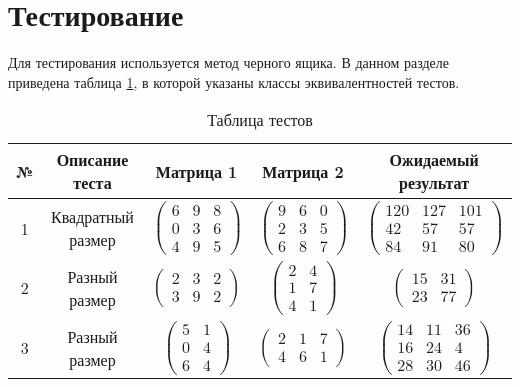\section{Тестирование}
Для тестирования используется метод черного ящика. В данном разделе приведена таблица \ref{table:ref1}, в которой указаны классы эквивалентностей тестов.
\begin{table}[H]
	\centering
	\captionsetup{singlelinecheck = false, justification=raggedleft}
	\caption{Таблица тестов}
	\label{table:ref1}
	\begin{tabular}{|c|c|c|c|c|}
		\hline
		№ &Описание теста & Матрица 1  &  Матрица 2   &  Ожидаемый результат\\\hline
		1& Квадратный размер  & $\begin{pmatrix}6 & 9 & 8\\0 & 3 & 6\\4 & 9 & 5\end{pmatrix}$
		& $\begin{pmatrix}9 & 6 & 0\\2 & 3 & 5\\6 & 8 & 7\end{pmatrix}$
		& $\begin{pmatrix}120 & 127 & 101\\42 & 57 & 57\\84 & 91 & 80\end{pmatrix}$
		\\ \hline
		2& Разный размер	  & $\begin{pmatrix}2 & 3 & 2\\3 & 9 & 2\end{pmatrix}$
		& $\begin{pmatrix}2 & 4\\1 & 7\\4 & 1\end{pmatrix}$
		& $\begin{pmatrix}15 & 31\\23 & 77\end{pmatrix}$
		\\ \hline
		3&Разный размер		& $\begin{pmatrix}5 & 1\\0 & 4\\6 & 4\end{pmatrix}$
		& $\begin{pmatrix}2 & 1 & 7\\4 & 6 & 1\end{pmatrix}$
		& $\begin{pmatrix}14 & 11 & 36\\16 & 24 & 4\\28 & 30 & 46\end{pmatrix}$

\end{tabular}
\end{table}
